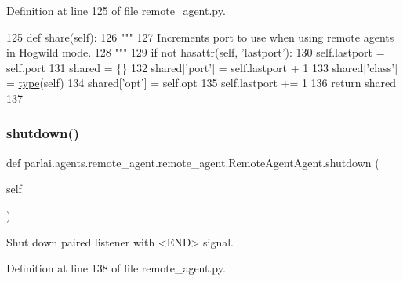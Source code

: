 Definition at line 125 of file remote\+\_\+agent.\+py.


\begin{DoxyCode}
125     \textcolor{keyword}{def }share(self):
126         \textcolor{stringliteral}{"""}
127 \textcolor{stringliteral}{        Increments port to use when using remote agents in Hogwild mode.}
128 \textcolor{stringliteral}{        """}
129         \textcolor{keywordflow}{if} \textcolor{keywordflow}{not} hasattr(self, \textcolor{stringliteral}{'lastport'}):
130             self.lastport = self.port
131         shared = \{\}
132         shared[\textcolor{stringliteral}{'port'}] = self.lastport + 1
133         shared[\textcolor{stringliteral}{'class'}] = \hyperlink{namespaceparlai_1_1agents_1_1tfidf__retriever_1_1build__tfidf_ad5dfae268e23f506da084a9efb72f619}{type}(self)
134         shared[\textcolor{stringliteral}{'opt'}] = self.opt
135         self.lastport += 1
136         \textcolor{keywordflow}{return} shared
137 
\end{DoxyCode}
\mbox{\label{classparlai_1_1agents_1_1remote__agent_1_1remote__agent_1_1RemoteAgentAgent_a1ca8a505b8d7cf89064c350736eb4ac0}} 
\subsubsection{\texorpdfstring{shutdown()}{shutdown()}}
{\footnotesize\ttfamily def parlai.\+agents.\+remote\+\_\+agent.\+remote\+\_\+agent.\+Remote\+Agent\+Agent.\+shutdown (\begin{DoxyParamCaption}\item[{}]{self }\end{DoxyParamCaption})}

\begin{DoxyVerb}Shut down paired listener with <END> signal.
\end{DoxyVerb}
 

Definition at line 138 of file remote\+\_\+agent.\+py.


